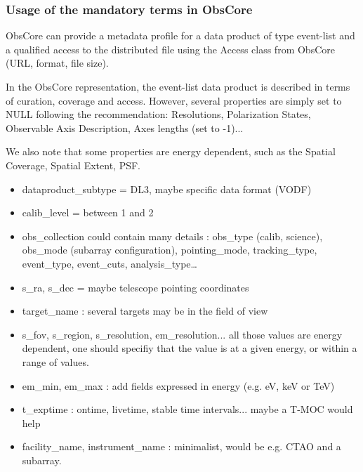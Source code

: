 \documentclass[11pt,a4paper]{ivoa}
\begin{document}
%


\subsubsection{Usage of the mandatory terms in ObsCore}

ObsCore \citep{2017ivoa.spec.0509L} can provide a metadata profile for a data product of type event-list and a qualified access to the distributed file using the Access class from ObsCore (URL, format, file size).

In the ObsCore representation, the event-list data product is described in terms of curation, coverage and access. However, several properties are simply set to NULL following the recommendation: Resolutions, Polarization States, Observable Axis Description, Axes lengths (set to -1)...

We also note that some properties are energy dependent, such as the Spatial Coverage, Spatial Extent, PSF.


\begin{itemize}
    \item dataproduct\_subtype = DL3, maybe specific data format (VODF)
    \item calib\_level = between 1 and 2
    \item obs\_collection could contain many details : obs\_type (calib, science), obs\_mode (subarray
configuration), pointing\_mode, tracking\_type, event\_type, event\_cuts, analysis\_type…
    \item s\_ra, s\_dec = maybe telescope pointing coordinates
    \item target\_name : several targets may be in the field of view
    \item s\_fov, s\_region, s\_resolution, em\_resolution... all those values are energy dependent, one should specifiy that the value is at a given energy, or within a range of values.
    \item em\_min, em\_max : add fields expressed in energy (e.g. eV, keV or TeV)
    \item t\_exptime : ontime, livetime, stable time intervals... maybe a T-MOC would help
    \item facility\_name, instrument\_name : minimalist, would be e.g. CTAO and a subarray.
\end{itemize}
\end{document}
